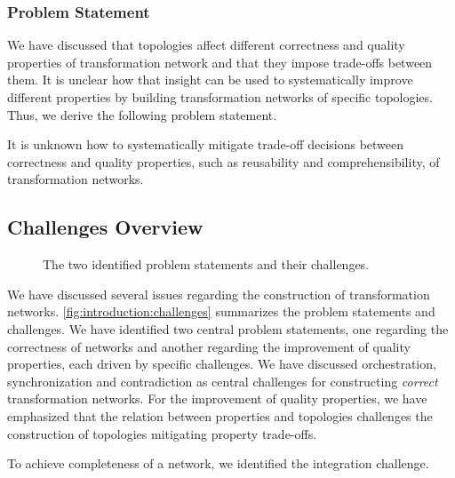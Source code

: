 \subsubsection*{Problem Statement}

We have discussed that topologies affect different correctness and quality properties of transformation network and that they impose trade-offs between them.
It is unclear how that insight can be used to systematically improve different properties by building transformation networks of specific topologies.
Thus, we derive the following problem statement.

\begin{problemstatement}
    It is unknown how to systematically mitigate trade-off decisions between correctness and quality properties, such as reusability and comprehensibility, of transformation networks.
\end{problemstatement}


\subsection{Challenges Overview}

\begin{figure}
    \centering
    
    \caption[Problem statements and challenges]{The two identified problem statements and their challenges.}
    \label{fig:introduction:challenges}
\end{figure}

We have discussed several issues regarding the construction of transformation networks.
\autoref{fig:introduction:challenges} summarizes the problem statements and challenges.
We have identified two central problem statements, one regarding the correctness of networks and another regarding the improvement of quality properties, each driven by specific challenges.
We have discussed orchestration, synchronization and contradiction as central challenges for constructing \emph{correct} transformation networks.
For the improvement of quality properties, we have emphasized that the relation between properties and topologies challenges the construction of topologies mitigating property trade-offs. %
\begin{integrationcontribution}
To achieve completeness of a network, we identified the integration challenge. %
\end{integrationcontribution}


